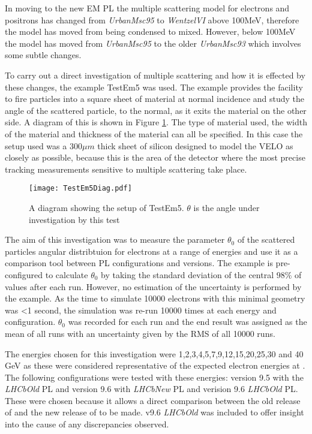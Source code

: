 In moving to the new EM PL the multiple scattering model for electrons and positrons has changed from \textit{UrbanMsc95} to \textit{WentzelVI} above 100MeV, therefore the model has moved from being condensed to mixed.  However, below 100MeV the model has moved from \textit{UrbanMsc95} to the older \textit{UrbanMsc93} which involves some subtle changes. %

To carry out a direct investigation of multiple scattering and how it is effected by these changes, the \geant example TestEm5 was used. The example provides the facility to fire particles into a square sheet of material at normal incidence and study the angle of the scattered particle, to the normal, as it exits the material on the other side. A diagram of this is shown in Figure \ref{fig:TestDiam}.  The type of material used, the width of the material and thickness of the material can all be specified. In this case the setup used was a $300 \mu m$ thick sheet of silicon designed to model the \lhcb VELO as closely as possible, because this is the area of the detector where the most precise tracking measurements sensitive to multiple scattering take place.
\begin{figure}[h]
  \centering
  \texttt{[image: TestEm5Diag.pdf]}
  \caption{A diagram showing the setup of TestEm5.  $\theta$ is the angle under investigation by this test}
  \label{fig:TestDiam}
\end{figure}

The aim of this investigation was to measure the parameter $\theta_0$ of the scattered particles angular distribtuion for electrons at a range of energies and use it as a comparison tool between PL configurations and \geant versions.  The \geant example is pre-configured to calculate $\theta_0$ by taking the standard deviation of the central $98\%$ of values after each run.  However, no estimation of the uncertainty is performed by the example. As the time to simulate 10000 electrons with this minimal geometry was <1 second, the simulation was re-run 10000 times at each energy and configuration.  $\theta_0$ was recorded for each run and the end result was assigned as the mean of all runs with an uncertainty given by the RMS of all 10000 runs.

The energies chosen for this investigation were 1,2,3,4,5,7,9,12,15,20,25,30 and 40 GeV as these were considered representative of the expected electron energies at \lhcb. The following configurations were tested with these energies: \geant version 9.5 with the \textit{LHCbOld} PL and version 9.6 with \textit{LHCbNew} PL and verision 9.6 \textit{LHCbOld} PL.  These were chosen because it allows a direct comparison between the old release of \geant and the new release of \geant to be made.  v9.6 \textit{LHCbOld} was included to offer insight into the cause of any discrepancies observed.

